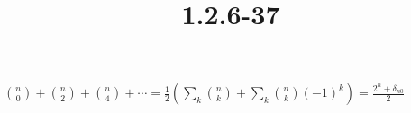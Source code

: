\documentclass{article}
\title{1.2.6-37}
\begin{document}
\maketitle

\( \binom{n}{0} + \binom{n}{2} + \binom{n}{4} + \cdots = \frac{1}{2}(\sum_k \binom{n}{k} + \sum_k \binom{n}{k}(-1)^k) = \frac{2^n + \delta_{n0}}{2} \)
\end{document}
